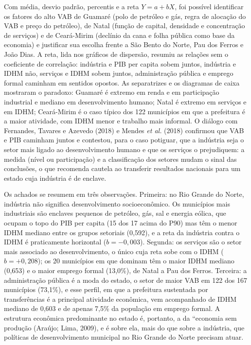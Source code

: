 \documentclass[12pt,a4paper]{article}
\begin{document}
Com média, desvio padrão, percentis e a reta $Y = a + bX$, foi possível identificar os fatores do alto VAB de Guamaré (polo de petróleo e gás, regra de alocação do VAB e preço do petróleo), de Natal (função de capital, densidade e concentração de serviços) e de Ceará-Mirim (declínio da cana e folha pública como base da economia) e justificar sua escolha frente a São Bento do Norte, Pau dos Ferros e João Dias. A reta, lida nos gráficos de dispersão, resumiu as relações sem o coeficiente de correlação: indústria e PIB per capita sobem juntos, indústria e IDHM não, serviços e IDHM sobem juntos, administração pública e emprego formal caminham em sentidos opostos. As separatrizes e os diagramas de caixa mostraram o paradoxo: Guamaré é extremo em renda e em participação industrial e mediano em desenvolvimento humano; Natal é extremo em serviços e em IDHM; Ceará-Mirim é o caso típico dos 122 municípios em que a prefeitura é a maior atividade, com IDHM menor e trabalho mais informal. O diálogo com Fernandes, Tavares e Azevedo (2018) e Mendes \textit{et al.} (2018) confirmou que VAB e PIB caminham juntos e contestou, para o caso potiguar, que a indústria seja o setor mais ligado ao desenvolvimento humano e que os serviços o prejudiquem: a medida (nível ou participação) e a classificação dos setores mudam o sinal das conclusões, o que recomenda cautela ao transferir resultados nacionais para um estado cuja indústria é de enclave.

Os achados se resumem em três observações. Primeira: no Rio Grande do Norte, indústria não significa desenvolvimento socioeconômico. Os municípios mais industriais são enclaves pequenos de petróleo, gás, sal e energia eólica, que ocupam o topo do PIB per capita (15 dos 17 acima do P90) mas têm o menor IDHM mediano entre os grupos setoriais (0,592), e a reta da indústria contra o IDHM é praticamente horizontal ($b = -0{,}003$). Segunda: os serviços são o setor mais associado ao desenvolvimento, o único cuja reta sobe com o IDHM ($b = +0{,}208$); os 20 municípios em que dominam têm o maior IDHM mediano (0,653) e o maior emprego formal (13,0\%), de Natal a Pau dos Ferros. Terceira: a administração pública é a moda do estado, o setor de maior VAB em 122 dos 167 municípios (73,1\%), e esse perfil, em que a prefeitura sustentada por transferências é a principal atividade econômica, vem acompanhado de IDHM mediano de 0,603 e de apenas 7,5\% da população em emprego formal. A estrutura econômica predominante no estado é, portanto, a da ``economia sem produção (Araújo; Lima, 2009), e é sobre ela, mais do que sobre a indústria, que políticas de desenvolvimento municipal no Rio Grande do Norte precisam atuar.
\end{document}
